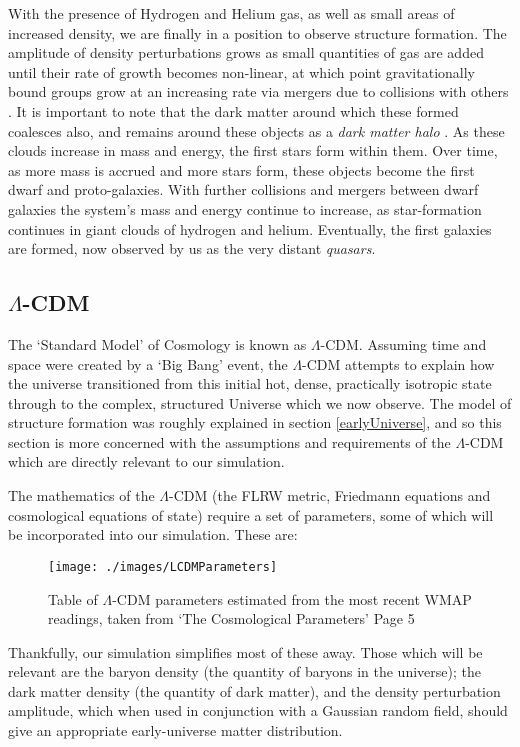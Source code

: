 \documentclass[11pt,a4paper]{article}
\begin{document}
With the presence of Hydrogen and Helium gas, as well as small areas of increased density, we are finally in a position to observe structure formation. The amplitude of density perturbations grows as small quantities of gas are added until their rate of growth becomes non-linear, at which point gravitationally bound groups grow at an increasing rate via mergers due to collisions with others \cite{recipe}. It is important to note that the dark matter around which these formed coalesces also, and remains around these objects as a \emph{dark matter halo} \cite{radial}. As these clouds increase in mass and energy, the first stars form within them. Over time, as more mass is accrued and more stars form, these objects become the first dwarf and proto-galaxies. With further collisions and mergers between dwarf galaxies the system's mass and energy continue to increase, as star-formation continues in giant clouds of hydrogen and helium. Eventually, the first galaxies are formed, now observed by us as the very distant \emph{quasars}. 

\subsection{$\Lambda$-CDM}
\label{lcdm}
The `Standard Model' of Cosmology is known as $\Lambda$-CDM. Assuming time and space were created by a `Big Bang' event, the $\Lambda$-CDM attempts to explain how the universe transitioned from this initial hot, dense, practically isotropic state through to the complex, structured Universe which we now observe. The model of structure formation was roughly explained in section \ref{earlyUniverse}, and so this section is more concerned with the assumptions and requirements of the $\Lambda$-CDM which are directly relevant to our simulation.

The mathematics of the $\Lambda$-CDM (the FLRW metric, Friedmann equations and cosmological equations of state) require a set of parameters, some of which will be incorporated into our simulation. These are: 

\begin{figure}[H]
\centering
\texttt{[image: ./images/LCDMParameters]}
\caption[Table of parameters for the $\Lambda$-CDM]{Table of $\Lambda$-CDM parameters estimated from the most recent WMAP readings, taken from `The Cosmological Parameters' Page 5 \cite{param}}
\label{cosmologicalParameters}
\end{figure}

\noindent Thankfully, our simulation simplifies most of these away. Those which will be relevant are the baryon density (the quantity of baryons in the universe); the dark matter density (the quantity of dark matter), and the density perturbation amplitude, which when used in conjunction with a Gaussian random field, should give an appropriate early-universe matter distribution.
\end{document}
